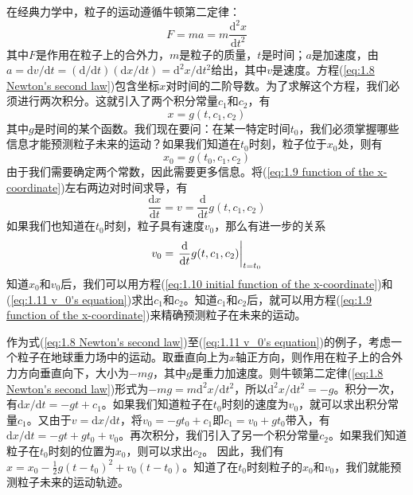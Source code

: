 	在经典力学中，粒子的运动遵循牛顿第二定律：
	\begin{equation}
		\boxed{F = ma = m \frac{\text{d}^2x}{\text{d}t^2}}
		\label{eq:1.8 Newton's second law}
	\end{equation}
	其中$F$是作用在粒子上的合外力，$m$是粒子的质量，$t$是时间；$a$是加速度，由$a = \text{d} v / \text{d}t = \left(\text{d} / \text{d}t\right)\left(\text{d}x / \text{d}t\right) = \text{d}^2x / \text{d} t^2$给出，其中$v$是速度。方程(\ref{eq:1.8 Newton's second law})包含坐标$x$对时间的二阶导数。为了求解这个方程，我们必须进行两次积分。这就引入了两个积分常量$c_1$和$c_2$，有
	\begin{equation}
		x=g\left(t,c_1,c_2\right)
		\label{eq:1.9 function of the x-coordinate}
	\end{equation}
	其中$g$是时间的某个函数。我们现在要问：在某一特定时间$t_0$，我们必须掌握哪些信息才能预测粒子未来的运动？如果我们知道在$t_0$时刻，粒子位于$x_0$处，则有
	\begin{equation}
		x_0=g\left(t_0,c_1,c_2\right)
		\label{eq:1.10 initial function of the x-coordinate}
	\end{equation}
	由于我们需要确定两个常数，因此需要更多信息。将(\ref{eq:1.9 function of the x-coordinate})左右两边对时间求导，有
	\begin{equation*}
		\frac{\text{d} x }{\text{d}t} = v = \frac{\text{d}}{\text{d} t} g\left(t,c_1,c_2\right)
		\label{eq*:derivative of g function with respect to time}
	\end{equation*}
	如果我们也知道在$t_0$时刻，粒子具有速度$v_0$，那么有进一步的关系
	\begin{equation}
		v_0 = \eval{\frac{\mathrm{d}}{\mathrm{d} t} g(t, c_1, c_2)}_{t = t_0}
		\label{eq:1.11 v_0's equation}
	\end{equation}
	知道$x_0$和$v_0$后，我们可以用方程(\ref{eq:1.10 initial function of the x-coordinate})和(\ref{eq:1.11 v_0's equation})求出$c_1$和$c_2$。知道$c_1$和$c_2$后，就可以用方程(\ref{eq:1.9 function of the x-coordinate})来精确预测粒子在未来的运动。

	作为式(\ref{eq:1.8 Newton's second law})至(\ref{eq:1.11 v_0's equation})的例子，考虑一个粒子在地球重力场中的运动。取垂直向上为$x$轴正方向，则作用在粒子上的合外力方向垂直向下，大小为$-mg$，其中$g$是重力加速度。则牛顿第二定律(\ref{eq:1.8 Newton's second law})形式为$-mg=m\mathrm{d}^2x/\mathrm{d}t^2$，所以$\mathrm{d}^2x/\mathrm{d}t^2=-g$。积分一次，有$\mathrm{d}x/\mathrm{d}t=-gt+c_1$。如果我们知道粒子在$t_0$时刻的速度为$v_0$，就可以求出积分常量$c_1$。又由于$v=\mathrm{d}x/\mathrm{d}t$，将$v_0=-gt_0+c_1$即$c_1=v_0+gt_0$带入，有$\mathrm{d}x/\mathrm{d}t=-gt+gt_0+v_0$。再次积分，我们引入了另一个积分常量$c_2$。如果我们知道粒子在$t_0$时刻的位置为$x_0$，则可以求出$c_2$。	因此，我们有$x=x_0-\frac{1}{2}g\left(t-t_0\right)^2+v_0\left(t-t_0\right)$。知道了在$t_0$时刻粒子的$x_0$和$v_0$，我们就能预测粒子未来的运动轨迹。

